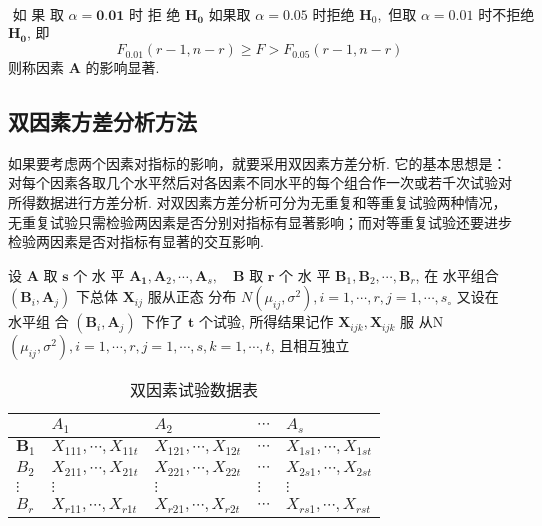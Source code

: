 $\text { 如 果 取 } \alpha=\mathbf{0 . 0 1} \text { 时 拒 绝 } \boldsymbol{H}_{\mathbf{0}}
\text { 如果取 } \alpha=0.05 \text { 时拒绝 } \boldsymbol{H}_{0}, \text { 但取 } \alpha=0.01 \text { 时不拒绝 }$
\( \boldsymbol{H}_{\mathbf{0}} \), 即
$$
F_{0.01}(r-1, n-r) \geq F>F_{0.05}(r-1, n-r)
$$
则称因素 \( \boldsymbol{A} \) 的影响显著. 

\subsection{双因素方差分析方法}

如果要考虑两个因素对指标的影响，就要采用双因素方差分析. 它的基本思想是：对每个因素各取几个水平然后对各因素不同水平的每个组合作一次或若千次试验对所得数据进行方差分析. 对双因素方差分析可分为无重复和等重复试验两种情况，无重复试验只需检验两因素是否分别对指标有显著影响；而对等重复试验还要进步检验两因素是否对指标有显著的交互影响. 

设 \( \boldsymbol{A} \) 取 \( \boldsymbol{s} \) 个 水 平 \( \boldsymbol{A}_{\mathbf{1}}, \boldsymbol{A}_{2}, \cdots, \boldsymbol{A}_{s}, \quad \boldsymbol{B} \) 取 \( \boldsymbol{r} \) 个 水 平
\( \boldsymbol{B}_{1}, \boldsymbol{B}_{2}, \cdots, \boldsymbol{B}_{r} \), 在 水平组合 \( \left(\boldsymbol{B}_{i}, \boldsymbol{A}_{j}\right) \) 下总体 \( \boldsymbol{X}_{i j} \) 服从正态
分布 \( N\left(\mu_{i j}, \sigma^{2}\right), i=1, \cdots, r, j=1, \cdots, s_{\circ} \) 又设在水平组
合 \( \left(\boldsymbol{B}_{i}, \boldsymbol{A}_{j}\right) \) 下作了 \( \boldsymbol{t} \) 个试验, 所得结果记作 \( \boldsymbol{X}_{i j k}, \boldsymbol{X}_{i j k} \) 服
从N \( \left(\mu_{i j}, \sigma^{2}\right), i=1, \cdots, r, j=1, \cdots, s, k=1, \cdots, t \), 且相互独立

\begin{table}
        \caption{双因素试验数据表}
        \begin{tabular}{l|llll}
        \hline & \( A_{1} \) & \( A_{2} \) & \( \cdots \) & \( A_{s} \) \\
        \hline \( \boldsymbol{B}_{1} \) & \( X_{111}, \cdots, X_{11 t} \) & \( X_{121}, \cdots, X_{12 t} \) & \( \cdots \) & \( X_{1 s 1}, \cdots, X_{1 s t} \) \\
        \( B_{2} \) & \( X_{211}, \cdots, X_{21 t} \) & \( X_{221}, \cdots, X_{22 t} \) & \( \cdots \) & \( X_{2 s 1}, \cdots, X_{2 s t} \) \\
        \( \vdots \) & \( \vdots \) & \( \vdots \) & \( \vdots \) & \( \vdots \) \\
        \( B_{r} \) & \( X_{r 11}, \cdots, X_{r 1 t} \) & \( X_{r 21}, \cdots, X_{r 2 t} \) & \( \cdots \) & \( X_{r s 1}, \cdots, X_{r s t} \) \\
        \hline
        \end{tabular}
\end{table}

